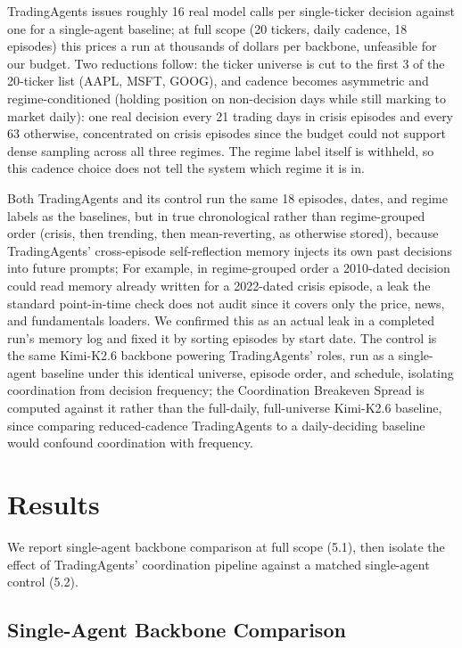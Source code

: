 \documentclass{article}
\begin{document}
TradingAgents issues roughly 16 real model calls per single-ticker decision against one for a single-agent baseline; at full scope (20 tickers, daily cadence, 18 episodes) this prices a run at thousands of dollars per backbone, unfeasible for our budget. Two reductions follow: the ticker universe is cut to the first 3 of the 20-ticker list (AAPL, MSFT, GOOG), and cadence becomes asymmetric and regime-conditioned (holding position on non-decision days while still marking to market daily): one real decision every 21 trading days in crisis episodes and every 63 otherwise, concentrated on crisis episodes since the budget could not support dense sampling across all three regimes. The regime label itself is withheld, so this cadence choice does not tell the system which regime it is in.

Both TradingAgents and its control run the same 18 episodes, dates, and regime labels as the baselines, but in true chronological rather than regime-grouped order (crisis, then trending, then mean-reverting, as otherwise stored), because TradingAgents' cross-episode self-reflection memory injects its own past decisions into future prompts; For example, in regime-grouped order a 2010-dated decision could read memory already written for a 2022-dated crisis episode, a leak the standard point-in-time check does not audit since it covers only the price, news, and fundamentals loaders. We confirmed this as an actual leak in a completed run's memory log and fixed it by sorting episodes by start date. The control is the same Kimi-K2.6 backbone powering TradingAgents' roles, run as a single-agent baseline under this identical universe, episode order, and schedule, isolating coordination from decision frequency; the Coordination Breakeven Spread is computed against it rather than the full-daily, full-universe Kimi-K2.6 baseline, since comparing reduced-cadence TradingAgents to a daily-deciding baseline would confound coordination with frequency.

\section{Results}

We report single-agent backbone comparison at full scope (5.1), then isolate the effect of TradingAgents' coordination pipeline against a matched single-agent control (5.2).

\subsection{Single-Agent Backbone Comparison}
\end{document}
